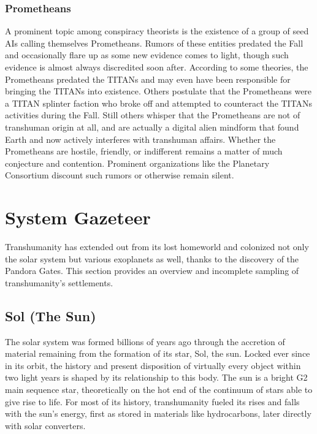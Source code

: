 \subsubsection{Prometheans}

A prominent topic among conspiracy theorists is the 
existence of a group of seed AIs calling themselves 
Prometheans. Rumors of these entities predated the 
Fall and occasionally flare up as some new evidence 
comes to light, though such evidence is almost always 
discredited soon after. According to some theories, the 
Prometheans predated the TITANs and may even have 
been responsible for bringing the TITANs into existence. Others postulate that the Prometheans were a 
TITAN splinter faction who broke off and attempted 
to counteract the TITANs activities during the Fall. 
Still others whisper that the Prometheans are not of 
transhuman origin at all, and are actually a digital 
alien mindform that found Earth and now actively 
interferes with transhuman affairs. Whether the Prometheans are hostile, friendly, or indifferent remains a 
matter of much conjecture and contention. Prominent 
organizations like the Planetary Consortium discount 
such rumors or otherwise remain silent.

\section{System Gazeteer}

Transhumanity has extended out from its lost homeworld and colonized not only the solar system but various exoplanets as well, thanks to the discovery of the 
Pandora Gates. This section provides an overview and 
incomplete sampling of transhumanity's settlements.

\subsection{Sol (The Sun)}

The solar system was formed billions of years ago 
through the accretion of material remaining from the 
formation of its star, Sol, the sun. Locked ever since in 
its orbit, the history and present disposition of virtually every object within two light years is shaped by 
its relationship to this body. The sun is a bright G2 
main sequence star, theoretically on the hot end of the 
continuum of stars able to give rise to life. For most 
of its history, transhumanity fueled its rises and falls 
with the sun's energy, first as stored in materials like 
hydrocarbons, later directly with solar converters.

